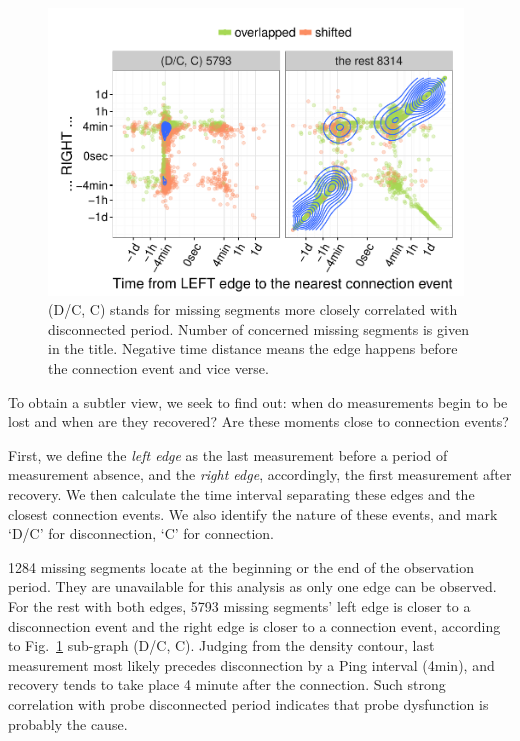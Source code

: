\begin{figure}[!htb]
\centering
\includegraphics[width=0.98\textwidth]{gfx/chap3/all.pdf}
\caption{(D/C, C) stands for missing segments more closely correlated with disconnected period.
Number of concerned missing segments is given in the title. Negative time distance means the edge happens before the connection event and vice verse.}
\label{fig:all}
\end{figure}

To obtain a subtler view, we seek to find out: when do measurements begin to be lost and when are they recovered? Are these moments close to connection events?

First, we define the \textit{left edge} as the last measurement before a period of measurement absence, and the \textit{right edge}, accordingly, the first measurement after recovery. 
We then calculate the time interval separating these edges and the closest connection events. We also identify the nature of these events, and mark `D/C' for disconnection, `C' for connection. 

1284 missing segments locate at the beginning or the end of the observation period. 
They are unavailable for this analysis as only one edge can be observed.
For the rest with both edges, 5793 missing segments' left edge is closer to a disconnection event and the right edge is closer to a connection event, according to Fig.~\ref{fig:all} sub-graph (D/C, C).
Judging from the density contour, last measurement most likely precedes disconnection by a Ping interval (4min), and recovery tends to take place 4 minute after the connection.
Such strong correlation with probe disconnected period indicates that probe dysfunction is probably the cause.

